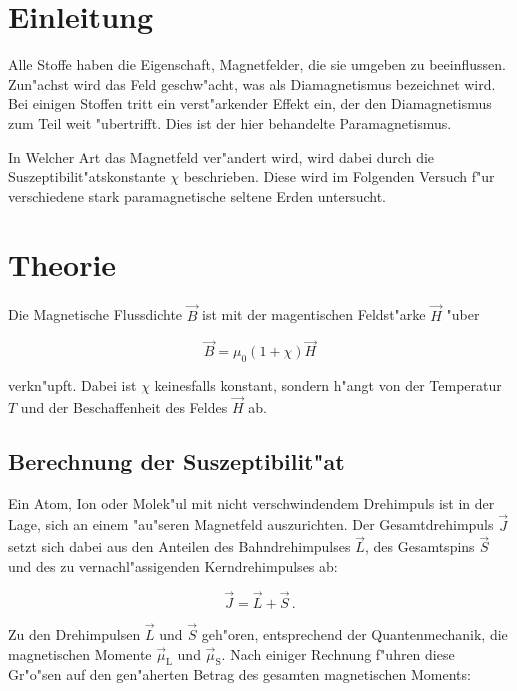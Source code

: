 \section{Einleitung} %
	\label{sec:einleitung}

	Alle Stoffe haben die Eigenschaft, Magnetfelder, die sie umgeben zu beeinflussen.
	Zun"achst wird das Feld geschw"acht, was als Diamagnetismus bezeichnet wird.
	Bei einigen Stoffen tritt ein verst"arkender Effekt ein, der den Diamagnetismus zum Teil weit "ubertrifft.
	Dies ist der hier behandelte Paramagnetismus.

	In Welcher Art das Magnetfeld ver"andert wird, wird dabei durch die Suszeptibilit"atskonstante $\chi$ beschrieben. Diese wird im Folgenden Versuch f"ur verschiedene stark paramagnetische seltene Erden untersucht.

\section{Theorie} %
	\label{sec:theorie}

	Die Magnetische Flussdichte $\vec{B}$ ist mit der magentischen Feldst"arke $\vec{H}$ "uber

	\begin{equation*}
		\vec{B} = \mu_0 \left(1 + \chi\right) \vec{H}
	\end{equation*}

	verkn"upft.
	Dabei ist $\chi$ keinesfalls konstant, sondern h"angt von der Temperatur $T$ und der Beschaffenheit des Feldes $\vec{H}$ ab.

	\subsection{Berechnung der Suszeptibilit"at}
		\label{subsec:berechnung}
		Ein Atom, Ion oder Molek"ul mit nicht verschwindendem Drehimpuls ist in der Lage, sich an einem "au"seren Magnetfeld auszurichten.
		Der Gesamtdrehimpuls $\vec{J}$ setzt sich dabei aus den Anteilen des Bahndrehimpulses $\vec{L}$, des Gesamtspins $\vec{S}$ und des zu vernachl"assigenden Kerndrehimpulses ab:

		\begin{equation*}
			\vec{J} = \vec{L} + \vec{S}\,.
		\end{equation*}

		Zu den Drehimpulsen $\vec{L}$ und $\vec{S}$ geh"oren, entsprechend der Quantenmechanik, die magnetischen Momente $\vec{\mu}_\mathrm{L}$ und $\vec{\mu}_\mathrm{S}$.
		Nach einiger Rechnung f"uhren diese Gr"o"sen auf den gen"aherten Betrag des gesamten magnetischen Moments:

